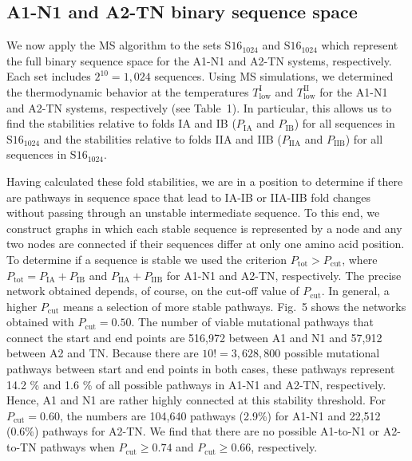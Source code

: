 \documentclass[%
 aip,
rsi,%
 amsmath,amssymb,
 reprint,%
]{revtex4-1}
\newcommand {\Pcut}     	{{P_\mathrm{cut}}}
\newcommand {\TlowI}     {{T^\mathrm{I}_\mathrm{low}}}
\newcommand {\TlowII}    {{T^\mathrm{II}_\mathrm{low}}}
\newcommand {\Ptot}	{{P_\mathrm{tot}}}
\newcommand {\PIA}    	{{P_\mathrm{IA}}}
\newcommand {\PIB}    	{{P_\mathrm{IB}}}
\newcommand {\PIIA}    	{{P_\mathrm{IIA}}}
\newcommand {\PIIB}    	{{P_\mathrm{IIB}}}
\newcommand {\SI}		{${\mathrm{S16}_{1024}}$}
\newcommand {\SII}		{${\mathrm{S16}_{1024}}$}
\begin{document}
\subsection{A1-N1 and A2-TN binary sequence space}
\noindent

We now apply the MS algorithm to the sets {\SI} and {\SII} which represent the full binary sequence space for the A1-N1 and A2-TN systems, respectively. Each set includes $2^{10}=1,024$ sequences. Using MS simulations, we determined the thermodynamic behavior at the temperatures $\TlowI$ and $\TlowII$ for the A1-N1 and A2-TN systems, respectively (see Table~1). In particular, this allows us to find the stabilities relative to folds IA and IB ($\PIA$ and $\PIB$) for all sequences in {\SI} and the stabilities relative to folds IIA and IIB ($\PIIA$ and $\PIIB$) for all sequences in {\SII}.


Having calculated these fold stabilities, we are in a position to determine if there are pathways in sequence space that lead to IA-IB or IIA-IIB fold changes without passing through an unstable intermediate sequence. To this end, we construct graphs in which each stable sequence is represented by a node and any two nodes are connected if their sequences differ at only one amino acid position. To determine if a sequence is stable we used the criterion $P_\mathrm{tot}>\Pcut$, where  $\Ptot = \PIA + \PIB$ and $\PIIA + \PIIB$ for A1-N1 and A2-TN, respectively. The precise network obtained depends, of course, on the cut-off value of $\Pcut$. In general, a higher $\Pcut$ means a selection of more stable pathways. Fig.~5 shows the networks obtained with $\Pcut=0.50$. The number of viable mutational pathways that connect the start and end points are 516,972 between A1 and N1 and  57,912 between A2 and TN. Because there are $10! =3,628,800$ possible mutational pathways between start and end points in both cases, these pathways represent 14.2 \% and 1.6 \% of all possible pathways in A1-N1 and A2-TN, respectively. Hence, A1 and N1 are rather highly connected at this stability threshold. For $\Pcut=0.60$, the numbers are 104,640 pathways (2.9\%) for A1-N1 and 22,512 (0.6\%) pathways for A2-TN. We find that there are no possible A1-to-N1 or A2-to-TN pathways when $\Pcut\ge0.74$ and $\Pcut\ge 0.66$, respectively. \\
\end{document}
